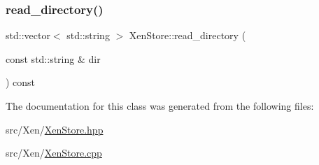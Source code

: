 \mbox{\label{classxd_1_1xen_1_1_xen_store_a8a3a5ae6e04b32e240c7d8d53ae071da}} 
\subsubsection{\texorpdfstring{read\+\_\+directory()}{read\_directory()}}
{\footnotesize\ttfamily std\+::vector$<$ std\+::string $>$ Xen\+Store\+::read\+\_\+directory (\begin{DoxyParamCaption}\item[{const std\+::string \&}]{dir }\end{DoxyParamCaption}) const}



The documentation for this class was generated from the following files\+:\begin{DoxyCompactItemize}
\item 
src/\+Xen/\mbox{\hyperlink{_xen_store_8hpp}{Xen\+Store.\+hpp}}\item 
src/\+Xen/\mbox{\hyperlink{_xen_store_8cpp}{Xen\+Store.\+cpp}}\end{DoxyCompactItemize}
